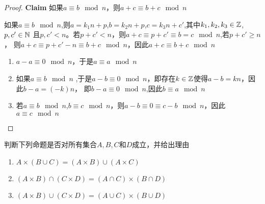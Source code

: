 \documentclass[11pt]{article}
\begin{document}
\begin{proof}
\textbf{Claim} 如果\(a\equiv b\mod n\)，则\(a+c\equiv b+c\mod n\)

如果\(a\equiv b\mod n\),则\(a=k_1n+p\),\(b=k_2n+p\),\(c=k_3n+c'\),其中\(k_1,k_2,k_3\in\mathbb{Z}\),\(p,c'\in\mathbb{N}\)
且\(p,c'<n\)。若\(p+c'<n\)，则\(a+c\equiv p+c'\equiv b=c\mod n\),若\(p+c'\ge n\)，
则\(a+c\equiv p+c'-n\equiv b+c\mod n\)，因此\(a+c\equiv b+c\mod n\)

\begin{enumerate}
\item \(a-a\equiv 0\mod n\)，于是\(a\equiv a\mod n\)
\item 如果\(a\equiv b\mod n\) ,于是\(a-b\equiv 0\mod n\)，即存在\(k\in\mathbb{Z}\)使得\(a-b=kn\)，因此\(b-a=(-k)n\)，
即\(b-a\equiv 0\mod n\),因此\(b\equiv a\mod n\)
\item 若\(a\equiv b\mod n\),\(b\equiv c\mod n\)，则\(a-b\equiv 0\equiv c-b\mod n\)，因此\(a\equiv c\mod n\)
\end{enumerate}
\end{proof}

\begin{exercise}[1.3.3]
判断下列命题是否对所有集合\(A,B,C\)和\(D\)成立，并给出理由
\begin{enumerate}
\item \(A\times(B\cup C)=(A\times B)\cup(A\times C)\)
\item \((A\times B)\cap(C\times D)=(A\cap C)\times(B\cap D)\)
\item \((A\times B)\cup(C\times D)=(A\cup C)\times(B\cup D)\)
\end{enumerate}
\end{exercise}
\end{document}
